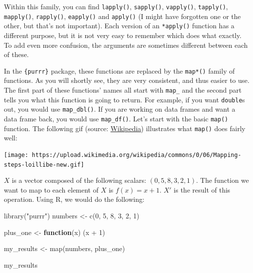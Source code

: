 \documentclass[
]{article}
\newenvironment{Shaded}{\begin{snugshade}}{\end{snugshade}}
\newcommand{\ControlFlowTok}[1]{\textcolor[rgb]{0.13,0.29,0.53}{\textbf{#1}}}
\newcommand{\DecValTok}[1]{\textcolor[rgb]{0.00,0.00,0.81}{#1}}
\newcommand{\FunctionTok}[1]{\textcolor[rgb]{0.00,0.00,0.00}{#1}}
\newcommand{\NormalTok}[1]{#1}
\newcommand{\OtherTok}[1]{\textcolor[rgb]{0.56,0.35,0.01}{#1}}
\newcommand{\SpecialCharTok}[1]{\textcolor[rgb]{0.00,0.00,0.00}{#1}}
\newcommand{\StringTok}[1]{\textcolor[rgb]{0.31,0.60,0.02}{#1}}
\begin{document}
Within this family, you can find \texttt{lapply()}, \texttt{sapply()}, \texttt{vapply()}, \texttt{tapply()}, \texttt{mapply()}, \texttt{rapply()},
\texttt{eapply()} and \texttt{apply()} (I might have forgotten one or the other, but that's not important).
Each version of an \texttt{*apply()} function has a different purpose, but it is not very easy to
remember which does what exactly. To add even more confusion, the arguments are sometimes different between
each of these.

In the \texttt{\{purrr\}} package, these functions are replaced by the \texttt{map*()} family of functions. As you will
shortly see, they are very consistent, and thus easier to use.
The first part of these functions' names all start with \texttt{map\_} and the second part tells you what
this function is going to return. For example, if you want \texttt{double}s out, you would use \texttt{map\_dbl()}.
If you are working on data frames and want a data frame back, you would use \texttt{map\_df()}. Let's start
with the basic \texttt{map()} function. The following gif
(source: \href{https://en.wikipedia.org/wiki/Map_(higher-order_function)}{Wikipedia}) illustrates
what \texttt{map()} does fairly well:

\texttt{[image: https://upload.wikimedia.org/wikipedia/commons/0/06/Mapping-steps-loillibe-new.gif]}

\(X\) is a vector composed of the following scalars: \((0, 5, 8, 3, 2, 1)\). The function we want to
map to each element of \(X\) is \(f(x) = x + 1\). \(X'\) is the result of this operation. Using R, we
would do the following:

\begin{Shaded}
\begin{Highlighting}[]
\FunctionTok{library}\NormalTok{(}\StringTok{"purrr"}\NormalTok{)}
\NormalTok{numbers }\OtherTok{\textless{}{-}} \FunctionTok{c}\NormalTok{(}\DecValTok{0}\NormalTok{, }\DecValTok{5}\NormalTok{, }\DecValTok{8}\NormalTok{, }\DecValTok{3}\NormalTok{, }\DecValTok{2}\NormalTok{, }\DecValTok{1}\NormalTok{)}

\NormalTok{plus\_one }\OtherTok{\textless{}{-}} \ControlFlowTok{function}\NormalTok{(x) (x }\SpecialCharTok{+} \DecValTok{1}\NormalTok{)}

\NormalTok{my\_results }\OtherTok{\textless{}{-}} \FunctionTok{map}\NormalTok{(numbers, plus\_one)}

\NormalTok{my\_results}
\end{Highlighting}
\end{Shaded}
\end{document}
